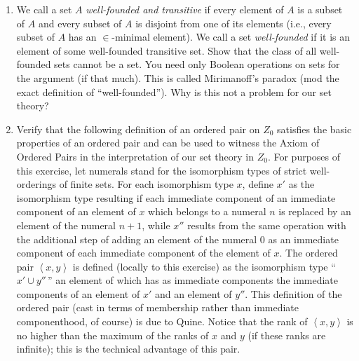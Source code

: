 \begin{enumerate}

\item  We call a set $A$ {\em well-founded and transitive\/} if every element
  of $A$ is a subset of $A$ and every subset of $A$ is disjoint
  from one of its elements (i.e., every subset of $A$ has an
  $\in$-minimal element).  We call a set {\itshape well-founded\/} if it is an
  element of some well-founded transitive set.  Show that the class of all
  well-founded sets cannot be a set.  You need only Boolean operations on sets for the argument (if that much).
  This is called Mirimanoff's paradox (mod the
  exact definition of ``well-founded'').  Why is this not a problem for our set
  theory? 

\item  Verify that the following definition of an ordered pair on $Z_0$ satisfies the basic properties of an ordered pair and can be
  used to witness the Axiom of Ordered Pairs in the interpretation of our set
  theory in $Z_0$.  For purposes of this exercise, let numerals stand for the
  isomorphism types of strict
  well-orderings of finite sets.  For
  each isomorphism type $x$, define $x'$ as the isomorphism type resulting if
  each immediate component of an immediate component of an element of $x$ which
  belongs to a numeral $n$ is replaced by an element of the numeral $n+1$,
  while $x''$ results from the same operation with the additional step of
  adding an element of the numeral $0$ as an immediate component of each
  immediate component of the element of $x$.  The ordered pair
  $\left<x,y\right>$ is defined (locally to this exercise) as the isomorphism
  type ``$x' \cup y''\,$'' an element of which has as immediate components the
  immediate components of an element of $x'$ and an element of $y''$.  This
  definition of the ordered pair (cast in terms of membership
  rather than immediate componenthood, of course) is due to Quine.  Notice that
  the rank of $\left<x,y\right>$ is no higher than the maximum of the ranks of
  $x$ and $y$ (if these ranks are infinite); this is the
  technical advantage of this pair. 
\end{enumerate}
